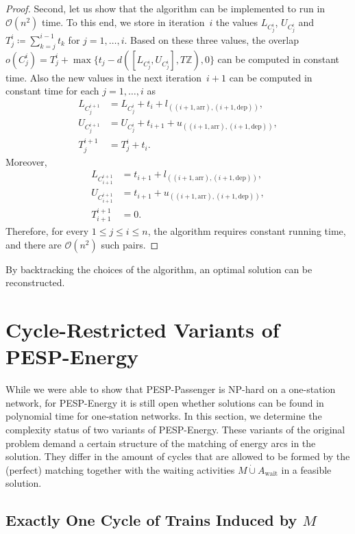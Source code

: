\documentclass[11pt,a4paper]{article}
\newcommand{\dotcup}{\mathbin{\dot\cup}}
\newcommand{\arr}{\mathrm{arr}}
\newcommand{\dep}{\mathrm{dep}}
\newcommand{\wait}{\mathrm{wait}}
\newcommand{\energyact}{M}               %
\newcommand{\pesppassenger}{PESP-Passenger\xspace}
\newcommand{\pespenergy}{PESP-Energy\xspace}
\newcommand{\osn}{one-station network\xspace}
\theoremstyle{definition}
\theoremstyle{remark}
\begin{document}
\begin{proof}
    Second, let us show that the algorithm can be implemented to run in $\mathcal O(n^2)$ time. To this end, we store in iteration~$i$ the values $L_{C_j^i}$, $U_{C_j^i}$ and $T_j^i \coloneqq \sum_{k=j}^{i-1} t_k$ for $j=1,\dotsc,i$. Based on these three values, the overlap $o(C_j^i) = T_j^i + \max\{t_j - d([L_{C_j^i}, U_{C_j^i}], T\mathbb Z), 0\}$ can be computed in constant time. Also the new values in the next iteration~$i+1$ can be computed in constant time for each $j=1,\dotsc,i$ as 
    \begin{align*}
     L_{C_j^{i+1}} &= L_{C_j^i} + t_i + l_{((i+1,\arr),(i+1,\dep))},\\ 
     U_{C_j^{i+1}} &= U_{C_j^i} + t_{i+1} + u_{((i+1,\arr),(i+1,\dep))}, \\
     T_j^{i+1} &= T_j^i + t_i.
     \end{align*}
     Moreover, 
     \begin{align*}
      L_{C_{i+1}^{i+1}} &= t_{i+1} + l_{((i+1,\arr),(i+1,\dep))}, \\
      U_{C_{i+1}^{i+1}} &= t_{i+1} + u_{((i+1,\arr),(i+1,\dep))},\\ 
      T_{i+1}^{i+1} &= 0.
     \end{align*}
     Therefore, for every $1 \le j \le i \le n$, the algorithm requires constant running time, and there are $\mathcal O(n^2)$ such pairs.
\end{proof}

By backtracking the choices of the algorithm, an optimal solution can be reconstructed.


\section{Cycle-Restricted Variants of \pespenergy}
\label{sec-Variants}

While we were able to show that \pesppassenger is NP-hard on a \osn, for \pespenergy it is still open whether solutions can be found in polynomial time for one-station networks. 
In this section, we determine the complexity status of two variants of \pespenergy. These variants of the original problem demand a certain structure of the matching of energy arcs in the solution. They differ in the amount of cycles that are allowed to be formed by the (perfect) matching together with the waiting activities $\energyact\dotcup A_{\wait}$ in a feasible solution. 

\subsection{Exactly One Cycle of Trains Induced by $\energyact$}
\end{document}
